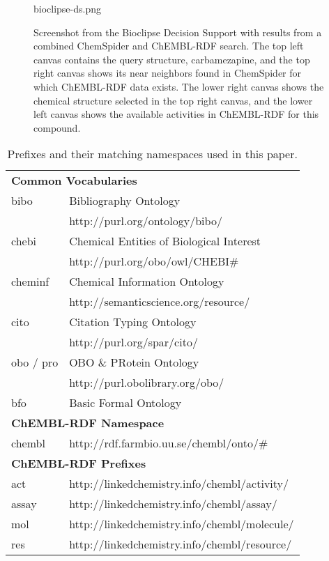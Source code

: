 \documentclass[10pt]{bmc_article}
\newenvironment{bmcformat}{\begin{raggedright}\baselineskip20pt\sloppy\setboolean{publ}{false}}{\end{raggedright}\baselineskip20pt\sloppy}
\begin{document}
\begin{bmcformat}
\begin{figure*}[!ht]
		\begin{center}
		bioclipse-ds.png
		\caption[wee]{Screenshot from the Bioclipse Decision Support with results from a combined ChemSpider and ChEMBL-RDF search. The top left canvas contains the query structure, carbamezapine, and the top right canvas shows its near neighbors found in ChemSpider for which ChEMBL-RDF data exists. The lower right canvas shows the chemical structure selected in the top right canvas, and the lower left canvas shows the available activities in ChEMBL-RDF for this compound.}
	\label{fig:bioclipse-ds}
		\end{center}
\end{figure*}

\newpage

\begin{table*}
\caption{Prefixes and their matching namespaces used in this paper.} \label{namespaces}
\begin{center}
\begin{tabular}{ll}
\hline
\multicolumn{2}{l}{\textbf{Common Vocabularies}} \\
bibo    & Bibliography Ontology~\cite{Giasson2011} \\
        & http://purl.org/ontology/bibo/ \\
chebi   & Chemical Entities of Biological Interest~\cite{DeMatos2010} \\
        & http://purl.org/obo/owl/CHEBI\# \\
cheminf & Chemical Information Ontology~\cite{Hastings2011} \\
        & http://semanticscience.org/resource/ \\
cito    & Citation Typing Ontology~\cite{Shotton2010} \\
        & http://purl.org/spar/cito/ \\
obo / pro & OBO \& PRotein Ontology~\cite{Natale2011} \\
          & http://purl.obolibrary.org/obo/ \\
bfo     & Basic Formal Ontology~\cite{Smith2004} \\

\multicolumn{2}{l}{\textbf{ChEMBL-RDF Namespace}} \\
chembl & http://rdf.farmbio.uu.se/chembl/onto/\# \\

\multicolumn{2}{l}{\textbf{ChEMBL-RDF Prefixes }}\\
act    & http://linkedchemistry.info/chembl/activity/ \\
assay  & http://linkedchemistry.info/chembl/assay/ \\
mol    & http://linkedchemistry.info/chembl/molecule/ \\
res    & http://linkedchemistry.info/chembl/resource/ \\
\hline
\end{tabular}
\end{center}
\end{table*}


\end{bmcformat}
\end{document}
